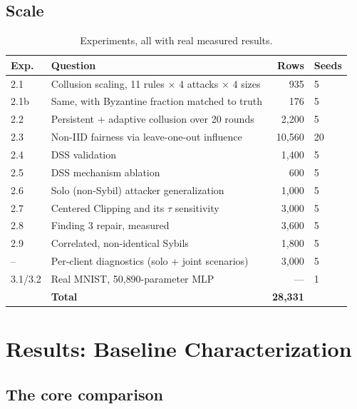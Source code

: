 \documentclass[11pt,a4paper]{article}
\begin{document}
\subsection{Scale}

\begin{table}[htbp]
\centering
\small
\caption{Experiments, all with real measured results.}
\label{tab:scale}
\begin{tabular}{llr l}
\toprule
\textbf{Exp.} & \textbf{Question} & \textbf{Rows} & \textbf{Seeds} \\
\midrule
2.1  & Collusion scaling, 11 rules $\times$ 4 attacks $\times$ 4 sizes & 935 & 5 \\
2.1b & Same, with Byzantine fraction matched to truth & 176 & 5 \\
2.2  & Persistent + adaptive collusion over 20 rounds & 2{,}200 & 5 \\
2.3  & Non-IID fairness via leave-one-out influence & 10{,}560 & 20 \\
2.4  & DSS validation & 1{,}400 & 5 \\
2.5  & DSS mechanism ablation & 600 & 5 \\
2.6  & Solo (non-Sybil) attacker generalization & 1{,}000 & 5 \\
2.7  & Centered Clipping and its $\tau$ sensitivity & 3{,}000 & 5 \\
2.8  & Finding 3 repair, measured & 3{,}600 & 5 \\
2.9  & Correlated, non-identical Sybils & 1{,}800 & 5 \\
--   & Per-client diagnostics (solo + joint scenarios) & 3{,}000 & 5 \\
3.1/3.2 & Real MNIST, 50{,}890-parameter MLP & --- & 1 \\
\midrule
     & \textbf{Total} & \textbf{28{,}331} & \\
\bottomrule
\end{tabular}
\end{table}

\section{Results: Baseline Characterization}
\label{sec:baseline}

\subsection{The core comparison}
\end{document}

